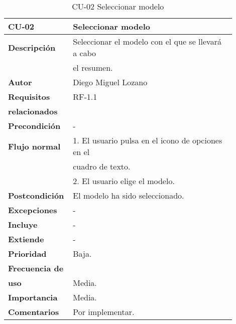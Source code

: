 \begin{longtable}{>{\raggedright}b{0.2\linewidth}>{\raggedright\arraybackslash}b{0.7\linewidth}}
	\toprule
	\textbf{CU-02} & \textbf{Seleccionar modelo} \\
	\toprule
	\endhead
	
	\toprule
	\caption{CU-02 Seleccionar modelo}
	\endfoot
	
	\small{\textbf{Descripción}} & Seleccionar el modelo con el que se llevará a cabo \\
	& el resumen. \\
	\small{\textbf{Autor}} & Diego Miguel Lozano \\
	\small{\textbf{Requisitos}} & RF-1.1  \\
	\small{\textbf{relacionados}} & \\
	\small{\textbf{Precondición}} & - \\
	\small{\textbf{Flujo normal}} & \quad \small{1. El usuario pulsa en el icono de opciones en el} \\
	& \qquad \small{cuadro de texto.} \\
	& \quad \small{2. El usuario elige el modelo.} \\
	\small{\textbf{Postcondición}} & El modelo ha sido seleccionado. \\
	\small{\textbf{Excepciones}} & - \\
	\small{\textbf{Incluye}} & - \\
	\small{\textbf{Extiende}} & - \\
	\small{\textbf{Prioridad}} & Baja. \\
	\small{\textbf{Frecuencia de}} & \\
	\small{\textbf{uso}} & Media. \\
	\small{\textbf{Importancia}} & Media. \\
	\small{\textbf{Comentarios}} &  Por implementar. \\
\end{longtable}


